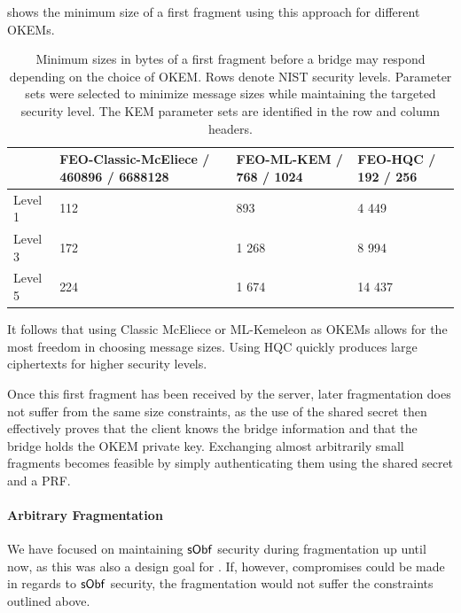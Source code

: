  shows the minimum size of a first fragment using this approach for different OKEMs.

\begin{table}
    \centering
    \begin{tabular}{@{} L{0.1\textwidth-\tabcolsep} | R{0.35\tabcolsep} R{0.25\tabcolsep} R{0.2\textwidth-\tabcolsep} @{}}
        & FEO-Classic-McEliece / 460896 / 6688128
        & FEO-ML-KEM / 768 / 1024
        & FEO-HQC / 192 / 256
        \\ \hline
    Level 1 & 112 & 893 & 4 449 \\
    Level 3 & 172 & 1 268 & 8 994 \\
    Level 5 & 224 & 1 674 & 14 437
    \end{tabular}
    \caption[
        Minimum sizes in bytes of a first fragment before a bridge may respond depending on the choice of OKEM.
    ]{
        Minimum sizes in bytes of a first fragment before a bridge may respond depending on the choice of OKEM. Rows denote NIST security levels. Parameter sets were selected to minimize message sizes while maintaining the targeted security level. The KEM parameter sets are identified in the row and column headers.
    }
    \label{tab:frag-min-needed}
\end{table}

It follows that using Classic McEliece or ML-Kemeleon as OKEMs allows for the most freedom in choosing message sizes. Using HQC quickly produces large ciphertexts for higher security levels.

Once this first fragment has been received by the server, later fragmentation does not suffer from the same size constraints, as the use of the shared secret then effectively proves that the client knows the bridge information and that the bridge holds the OKEM private key. Exchanging almost arbitrarily small fragments becomes feasible by simply authenticating them using the shared secret and a PRF.

\paragraph{Arbitrary Fragmentation}
We have focused on maintaining $\mathsf{sObf}$ security during fragmentation up until now, as this was also a design goal for \drivel{}.
If, however, compromises could be made in regards to $\mathsf{sObf}$ security, the fragmentation would not suffer the constraints outlined above.

